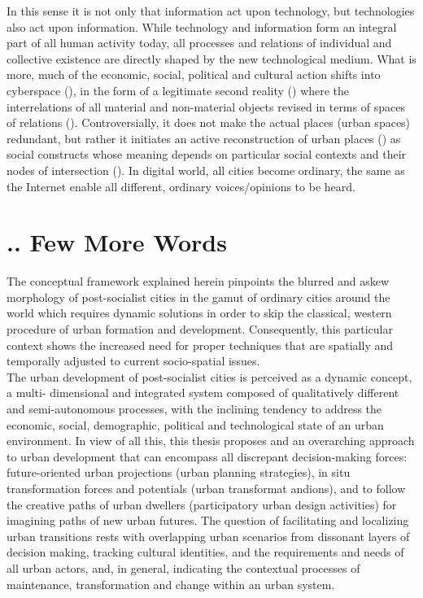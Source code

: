 \documentclass[11pt]{report}
\begin{document}
{{{In this sense it is not only that information act upon technology, but technologies also act upon information.
While technology and information form an integral part of all human activity today, all processes and relations of individual and collective existence are directly shaped by the new technological medium.
What is more, much of the economic, social, political and cultural action shifts into cyberspace (\href{Mitchell}{\citealt{mitchell_city_1996}}), in the form of a legitimate second reality (\href{Baudrillard}{\citealt{baudrillard_l_1983}}) where the interrelations of  all material and non-material objects revised in terms of spaces of relations (\href{Graham}{\citealt{graham_relational_1999}}).
Controversially, it does not make the actual places (urban spaces) redundant, but rather it initiates an active reconstruction of urban places (\href{ref}{\citealt{graham_splintering_2001}}) as social constructs whose meaning depends on particular social contexts and their nodes of intersection (\href{ref}{\citealt{healey_treatment_2004}}).
In digital world, all cities become ordinary, the same as the Internet enable all different, ordinary voices/opinions to be heard.

\section{.. Few More Words}

The conceptual framework explained herein pinpoints the blurred and askew morphology of post-socialist cities in the gamut of ordinary cities around the world which requires dynamic solutions in order to skip the classical, western procedure of urban formation and development. Consequently, this particular context shows the increased need for proper techniques that are spatially and temporally adjusted to current socio-spatial issues. 
\\

The urban development of post-socialist cities is perceived as a dynamic concept, a multi- dimensional and integrated system composed of qualitatively different and semi-autonomous processes, with the inclining tendency to address the economic, social, demographic, political and technological state of an urban environment.  In view of all this, this thesis proposes and an overarching approach to urban development that can encompass all discrepant decision-making forces: future-oriented urban projections (urban planning strategies), in situ transformation forces and potentials (urban transformat andions), and to follow the creative paths of urban dwellers (participatory urban design activities) for imagining paths of new urban futures.
The question of facilitating and localizing urban transitions rests with overlapping urban scenarios from dissonant layers of decision making, tracking cultural identities, and the requirements and needs of all urban actors, and, in general, indicating the contextual processes of maintenance, transformation and change within an urban system.

}}}
\end{document}
